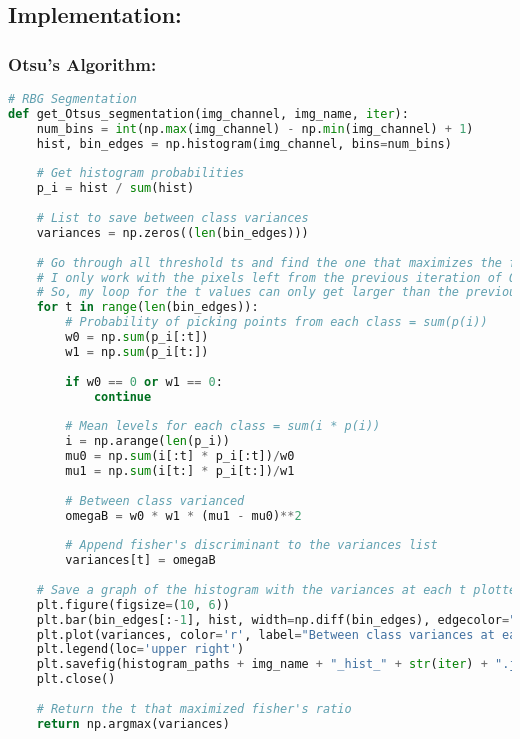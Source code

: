 \documentclass{article}
\begin{document}
\subsection{Implementation:}
\subsubsection{Otsu's Algorithm:}
\begin{lstlisting}[language=Python]
# RBG Segmentation
def get_Otsus_segmentation(img_channel, img_name, iter):
    num_bins = int(np.max(img_channel) - np.min(img_channel) + 1)
    hist, bin_edges = np.histogram(img_channel, bins=num_bins)
    
    # Get histogram probabilities
    p_i = hist / sum(hist)
    
    # List to save between class variances
    variances = np.zeros((len(bin_edges)))
    
    # Go through all threshold ts and find the one that maximizes the fisher discriminant
    # I only work with the pixels left from the previous iteration of Otsu's algorithm.
    # So, my loop for the t values can only get larger than the previous one
    for t in range(len(bin_edges)):
        # Probability of picking points from each class = sum(p(i))
        w0 = np.sum(p_i[:t])
        w1 = np.sum(p_i[t:])
        
        if w0 == 0 or w1 == 0:
            continue
        
        # Mean levels for each class = sum(i * p(i))
        i = np.arange(len(p_i))
        mu0 = np.sum(i[:t] * p_i[:t])/w0
        mu1 = np.sum(i[t:] * p_i[t:])/w1
        
        # Between class varianced
        omegaB = w0 * w1 * (mu1 - mu0)**2
        
        # Append fisher's discriminant to the variances list
        variances[t] = omegaB
        
    # Save a graph of the histogram with the variances at each t plotted on top
    plt.figure(figsize=(10, 6))
    plt.bar(bin_edges[:-1], hist, width=np.diff(bin_edges), edgecolor="black", align="edge", label="Pixel Value Histogram")
    plt.plot(variances, color='r', label="Between class variances at each t")
    plt.legend(loc='upper right')
    plt.savefig(histogram_paths + img_name + "_hist_" + str(iter) + ".jpg", format="jpg")
    plt.close()
    
    # Return the t that maximized fisher's ratio
    return np.argmax(variances)
\end{lstlisting}
\end{document}
